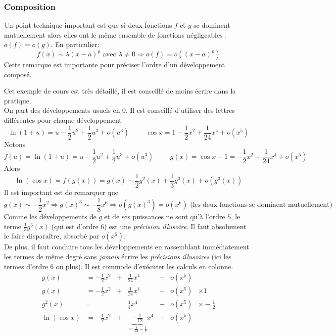 \subsubsection{Composition}
Un point technique important est que si deux fonctions $f$ et $g$ se dominent mutuellement alors elles ont le même ensemble de fonctions négligeables : $o(f)=o(g)$. En particulier:
\begin{displaymath}
 f(x) \sim \lambda (x-a)^p \text{ avec } \lambda\neq 0 \Rightarrow o(f)=o((x - a)^p) 
\end{displaymath}
Cette remarque est importante pour préciser l'ordre d'un développement composé.
\begin{exple}
 Cet exemple de cours est très détaillé, il est conseillé de moins écrire dans la pratique.\\
 On part des développements usuels en $0$. Il est conseillé d'utiliser des lettres différentes pour chaque développement
\begin{displaymath}
 \ln(1+u) = u - \frac{1}{2}u^2 + \frac{1}{2}u^3 + o(u^3)\hspace{1cm} \cos x = 1 - \frac{1}{2}x^2 + \frac{1}{24}x^4 + o(x^5)
\end{displaymath}
Notons
\begin{displaymath}
 f(u) = \ln(1+u) = u - \frac{1}{2}u^2 + \frac{1}{2}u^3 + o(u^3) \hspace{1cm} g(x) = \cos x -1 = -\frac{1}{2}x^2 + \frac{1}{24}x^4 + o(x^5)
\end{displaymath}
Alors
\begin{displaymath}
 \ln(\cos x) = f(g(x))
= g(x)-\frac{1}{2}g^2(x)+\frac{1}{3}g^3(x)+o(g^3(x))
\end{displaymath}
Il est important est de remarquer que 
\begin{displaymath}
  g(x) \sim -\frac{1}{2}x^2 \Rightarrow g(x)^3 \sim -\frac{1}{8}x^6 \Rightarrow o(g(x)^3) = o(x^6) \text{ (les deux fonctions se dominent mutuellement)}
\end{displaymath}
Comme les développements de $g$ et de ses puissances ne sont qu'à l'ordre $5$, le terme $\frac{1}{3}g^3(x)$ (qui est d'ordre $6$) est une \emph{précision illusoire}. Il faut absolument le faire disparaître, absorbé par $o(x^5)$.\\
De plus, il faut conduire tous les développements en rassemblant immédiatement les termes de même degré sans \emph{jamais} écrire les \emph{précisions illusoires} (ici les termes d'ordre $6$ ou plus). Il est commode d'exécuter les calculs en colonne.
\begin{align*}
 g(x)       &= -\frac{1}{2}x^2 &+&\frac{1}{24}x^4                           &+ &o(x^5) &\\
 g(x)       &= -\frac{1}{2}x^2 &+&\frac{1}{24}x^4                           &+ &o(x^5) &\times 1\\
 g^2(x)     &=                 & &\frac{1}{4}x^4                            &+ &o(x^5) &\times -\frac{1}{2}\\
\ln(\cos x) &= -\frac{1}{2}x^2 &+&\underset{=\frac{1}{24}-\frac{1}{8}}{\underbrace{-\frac{1}{12}}}x^4  &+ &o(x^5) 
\end{align*}
\end{exple}
 
